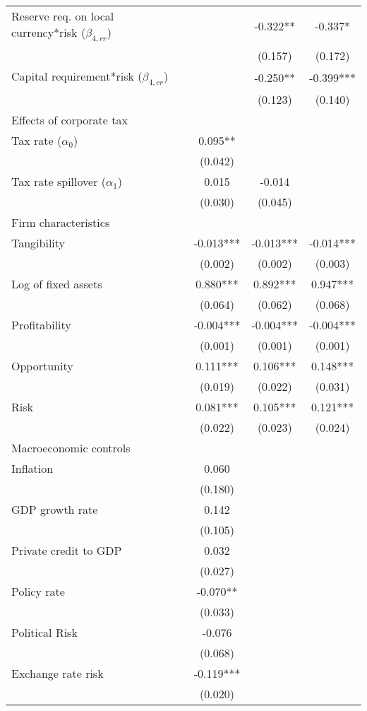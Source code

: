 \begin{longtable}{lccc}
\quad Reserve req. on local currency*risk ($\beta_{4,rr}$) &  & -0.322** & -0.337* \\
 &  & (0.157) & (0.172) \\
\quad Capital requirement*risk ($\beta_{4,cr}$) &  & -0.250** & -0.399*** \\
 &  & (0.123) & (0.140) \\
 Effects of corporate tax &  &  &  \\
\quad Tax rate ($\alpha_{0}$) & 0.095** &  &  \\
 & (0.042) &  &  \\
\quad Tax rate spillover ($\alpha_{1}$) & 0.015 & -0.014 &  \\
 & (0.030) & (0.045) &  \\
  Firm characteristics &  &  &  \\
\quad Tangibility & -0.013*** & -0.013*** & -0.014*** \\
 & (0.002) & (0.002) & (0.003) \\
\quad Log of fixed assets & 0.880*** & 0.892*** & 0.947*** \\
 & (0.064) & (0.062) & (0.068) \\
\quad Profitability & -0.004*** & -0.004*** & -0.004*** \\
 & (0.001) & (0.001) & (0.001) \\
\quad Opportunity & 0.111*** & 0.106*** & 0.148*** \\
 & (0.019) & (0.022) & (0.031) \\
\quad Risk & 0.081*** & 0.105*** & 0.121*** \\
 & (0.022) & (0.023) & (0.024) \\
   Macroeconomic controls &  &  &  \\
\quad Inflation & 0.060 &  &  \\
 & (0.180) &  &  \\
\quad GDP growth rate & 0.142 &  &  \\
 & (0.105) &  &  \\
\quad Private credit to GDP & 0.032 &  &  \\
 & (0.027) &  &  \\
\quad Policy rate & -0.070** &  &  \\
 & (0.033) &  &  \\
\quad Political Risk & -0.076 &  &  \\
 & (0.068) &  &  \\
\quad Exchange rate risk & -0.119*** &  &  \\
 & (0.020) &  &  \\

\end{longtable}
